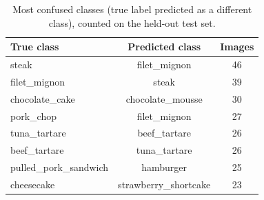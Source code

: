 \begin{table}[t]
\centering
\caption{Most confused classes (true label predicted as a different class), counted on the held-out test set.}
\label{tbl:confused}
\begin{tabular}{lcc}
\toprule
True class & Predicted class & Images \\
\midrule
steak & filet\_mignon & 46 \\
filet\_mignon & steak & 39 \\
chocolate\_cake & chocolate\_mousse & 30 \\
pork\_chop & filet\_mignon & 27 \\
tuna\_tartare & beef\_tartare & 26 \\
beef\_tartare & tuna\_tartare & 26 \\
pulled\_pork\_sandwich & hamburger & 25 \\
cheesecake & strawberry\_shortcake & 23 \\
\bottomrule
\end{tabular}
\end{table}
